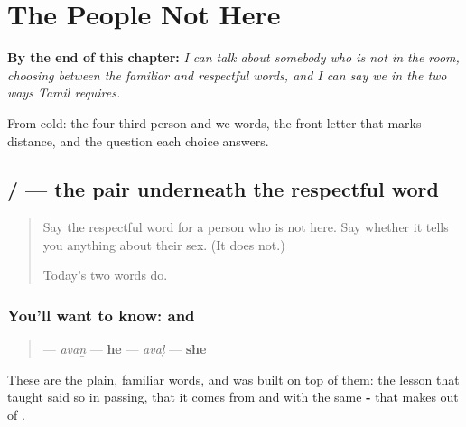 
\chapter{The People Not Here}
\label{ch:ta-avarkal}

\begin{chapteropening}
\textbf{By the end of this chapter:} \emph{I can talk about somebody who is not in the room, choosing between the familiar and respectful words, and I can say we in the two ways Tamil requires.}

From cold: the four third-person and we-words, the front letter that marks distance, and the question each choice answers.
\end{chapteropening}

\section[\texorpdfstring{\ta{அவன்} / \ta{அவள்} (avaṉ / avaḷ)}{அவன் / அவள் (avaṉ / avaḷ)}]{ /  — the pair underneath the respectful word}

\label{lesson:TA-C85-avan-aval}



\begin{quote}
Say the respectful word for a person who is not here. Say whether it tells you anything about their sex. (It does not.)

Today's two words do.
\end{quote}

\subsection*{You'll want to know:  and }
\begin{quote}
\textbf{} — \emph{avaṉ} — \textbf{he} \textbf{} — \emph{avaḷ} — \textbf{she}
\end{quote}

These are the plain, familiar words, and \textbf{} was built on top of them: the lesson that taught  said so in passing, that it comes from  and  with the same \textbf{-} that makes  out of .

